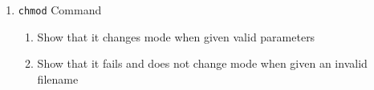 \documentclass[11pt,letterpaper]{report}
\begin{document}
\begin{enumerate}
                                                                                                                                                                                                                                                                                                                                                                                                                                                                                                                                                                                                                \item {\tt chmod} Command
                                                                                                                                                                                                                                                                                                                                                                                                                                                                                                                                                                                                                    \begin{enumerate}
                                                                                                                                                                                                                                                                                                                                                                                                                                                                                                                                                                                                                            \item Show that it changes mode when given valid parameters
                                                                                                                                                                                                                                                                                                                                                                                                                                                                                                                                                                                                                                    \item Show that it fails and does not change mode when given an invalid filename

\end{enumerate}
\end{enumerate}
\end{document}
